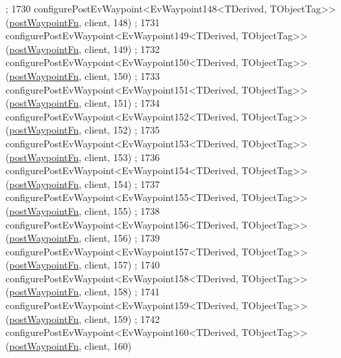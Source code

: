 \begin{DoxyCode}
      ;
1730     configurePostEvWaypoint<EvWaypoint148<TDerived, TObjectTag>>(\hyperlink{classcl__move__base__z_1_1WaypointEventDispatcher_a964a57fcce5d48ec60243230722d8dd7}{postWaypointFn}, client, 148)
      ;
1731     configurePostEvWaypoint<EvWaypoint149<TDerived, TObjectTag>>(\hyperlink{classcl__move__base__z_1_1WaypointEventDispatcher_a964a57fcce5d48ec60243230722d8dd7}{postWaypointFn}, client, 149)
      ;
1732     configurePostEvWaypoint<EvWaypoint150<TDerived, TObjectTag>>(\hyperlink{classcl__move__base__z_1_1WaypointEventDispatcher_a964a57fcce5d48ec60243230722d8dd7}{postWaypointFn}, client, 150)
      ;
1733     configurePostEvWaypoint<EvWaypoint151<TDerived, TObjectTag>>(\hyperlink{classcl__move__base__z_1_1WaypointEventDispatcher_a964a57fcce5d48ec60243230722d8dd7}{postWaypointFn}, client, 151)
      ;
1734     configurePostEvWaypoint<EvWaypoint152<TDerived, TObjectTag>>(\hyperlink{classcl__move__base__z_1_1WaypointEventDispatcher_a964a57fcce5d48ec60243230722d8dd7}{postWaypointFn}, client, 152)
      ;
1735     configurePostEvWaypoint<EvWaypoint153<TDerived, TObjectTag>>(\hyperlink{classcl__move__base__z_1_1WaypointEventDispatcher_a964a57fcce5d48ec60243230722d8dd7}{postWaypointFn}, client, 153)
      ;
1736     configurePostEvWaypoint<EvWaypoint154<TDerived, TObjectTag>>(\hyperlink{classcl__move__base__z_1_1WaypointEventDispatcher_a964a57fcce5d48ec60243230722d8dd7}{postWaypointFn}, client, 154)
      ;
1737     configurePostEvWaypoint<EvWaypoint155<TDerived, TObjectTag>>(\hyperlink{classcl__move__base__z_1_1WaypointEventDispatcher_a964a57fcce5d48ec60243230722d8dd7}{postWaypointFn}, client, 155)
      ;
1738     configurePostEvWaypoint<EvWaypoint156<TDerived, TObjectTag>>(\hyperlink{classcl__move__base__z_1_1WaypointEventDispatcher_a964a57fcce5d48ec60243230722d8dd7}{postWaypointFn}, client, 156)
      ;
1739     configurePostEvWaypoint<EvWaypoint157<TDerived, TObjectTag>>(\hyperlink{classcl__move__base__z_1_1WaypointEventDispatcher_a964a57fcce5d48ec60243230722d8dd7}{postWaypointFn}, client, 157)
      ;
1740     configurePostEvWaypoint<EvWaypoint158<TDerived, TObjectTag>>(\hyperlink{classcl__move__base__z_1_1WaypointEventDispatcher_a964a57fcce5d48ec60243230722d8dd7}{postWaypointFn}, client, 158)
      ;
1741     configurePostEvWaypoint<EvWaypoint159<TDerived, TObjectTag>>(\hyperlink{classcl__move__base__z_1_1WaypointEventDispatcher_a964a57fcce5d48ec60243230722d8dd7}{postWaypointFn}, client, 159)
      ;
1742     configurePostEvWaypoint<EvWaypoint160<TDerived, TObjectTag>>(\hyperlink{classcl__move__base__z_1_1WaypointEventDispatcher_a964a57fcce5d48ec60243230722d8dd7}{postWaypointFn}, client, 160)

\end{DoxyCode}

